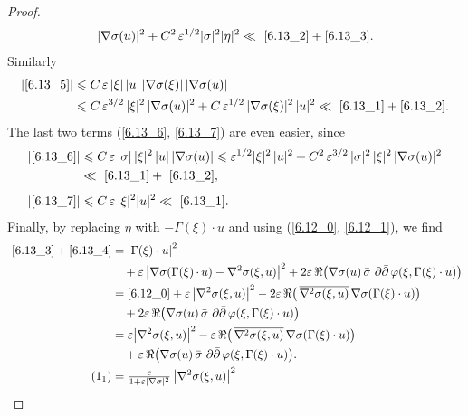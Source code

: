 \documentclass[10pt,a4paper]{article}
\DeclareMathOperator{\ddbar}{\partial\bar\partial}
\DeclarePairedDelimiter{\abs}{\lvert}{\rvert}
\let\leq\leqslant
\numberwithin{equation}{section}
\begin{document}
\begin{proof}
\begin{align*}
\abs{\nabla\sigma(u)}^2 + C^2\,\varepsilon^{1/2}
\abs{\sigma}^2
\abs{\eta}^2
\ll~\eqref{6.13_2}+\eqref{6.13_3}.
\end{align*}
Similarly
\begin{align*}
\abs*{\eqref{6.13_5}} &\leq C\,\varepsilon\, \abs{\xi}\,\abs{u}\,\abs{\nabla\sigma(\xi)}\,\abs{\nabla\sigma(u)}
\\
&\leq C\,\varepsilon^{3/2}\,\abs{\xi}^2\,\abs{\nabla\sigma(u)}^2 +C\,\varepsilon^{1/2}\,\abs{\nabla\sigma(\xi)}^2\,\abs{u}^2
\ll~\eqref{6.13_1}+\eqref{6.13_2}.
\end{align*}
The last two terms (\eqref{6.13_6}, \eqref{6.13_7}) are even easier, since
\begin{align*}
\abs*{\eqref{6.13_6}} &\leq C\,\varepsilon\,\abs{\sigma}\,\abs{\xi}^2\,\abs{u}\,\abs{\nabla\sigma(u)}
\leq \varepsilon^{1/2}\abs{\xi}^2\,\abs{u}^2+ C^2\,\varepsilon^{3/2}\,\abs{\sigma}^2\,\abs{\xi}^2\,\abs{\nabla\sigma(u)}^2
\\
&\ll~\eqref{6.13_1} +~\eqref{6.13_2},
\\[4pt]
\abs*{\eqref{6.13_7}} &\leq C\,\varepsilon\,\abs{\xi}^2\abs{u}^2
\ll~\eqref{6.13_1}.
\end{align*}
Finally, by replacing $\eta$ with $-\Gamma(\xi)\cdot u$ and using (\eqref{6.12_0}, \eqref{6.12_1}), we find
\begin{align}
\nonumber\stepcounter{equation}~\eqref{6.13_3}+\eqref{6.13_4} &=
\abs*{\Gamma(\xi)\cdot u}^2\\ &\quad{}+\varepsilon\,
\big|\nabla\sigma(\Gamma(\xi)\,{\cdot}\,u) -\nabla^2\sigma(\xi,u)\big|^2 +2\varepsilon\,\Re\big(
\nabla\sigma(u)\,\bar\sigma\,
\ddbar\varphi(\xi,\Gamma(\xi)\cdot u)\big)\\ &=\eqref{6.12_0}+\varepsilon\,\big|
\nabla^2\sigma(\xi,u)\big|^2-2\varepsilon\,\Re\big(
\,\overline{\nabla^2\sigma(\xi,u)}\,
\nabla\sigma(\Gamma(\xi)\cdot u)\big)\\ &\quad{}+2\varepsilon\,\Re\big(
\nabla\sigma(u)\,\bar\sigma\,
\ddbar\varphi(\xi,\Gamma(\xi)\cdot u)\big)\\ &=
\varepsilon
\abs*{\nabla^2\sigma(\xi,u)}^2 -\varepsilon\,\Re\big(\,
\overline{\nabla^2\sigma(\xi,u)}\,
\nabla\sigma(\Gamma(\xi)\cdot u)\big)\\ &\quad{}+\varepsilon\,\Re\big(
\nabla\sigma(u)\,\bar\sigma\,
\ddbar\varphi(\xi,\Gamma(\xi)\cdot u)\big).\\
\tag{$\theequation_1$}\label{6.14_1}
&=\tfrac{\varepsilon}{ 1+\varepsilon\abs{\nabla\sigma}^2}\,
\abs*{\nabla^2\sigma(\xi,u)}^2
\\

\end{align}
\end{proof}
\end{document}
